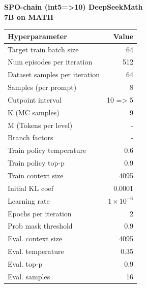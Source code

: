 \begin{minipage}[t]{0.48\textwidth}
    \centering
    \textbf{SPO-chain (int5=>10) DeepSeekMath \\ 7B on MATH}\\[4pt]
    \begin{tabular}{@{}lr@{}}
        \toprule
        Hyperparameter & Value \\ \midrule
        Target train batch size & 64 \\ 
        Num episodes per iteration & 512 \\ 
        Dataset samples per iteration & 64 \\
        Samples (per prompt) & 8 \\
        Cutpoint interval & 10 => 5 \\
        K (MC samples) & 9 \\
        M (Tokens per level) & - \\
        Branch factors & - \\
        Train policy temperature & 0.6 \\
        Train policy top-p & 0.9 \\
        Train context size & 4095 \\
        Initial KL coef & 0.0001 \\
        Learning rate & $1\times10^{-6}$ \\
        Epochs per iteration & 2 \\
        Prob mask threshold & 0.9 \\
        Eval. context size & 4095 \\
        Eval. temperature & 0.35 \\
        Eval. top-p & 0.9 \\
        Eval. samples & 16 \\
        \bottomrule
    \end{tabular}
\end{minipage}